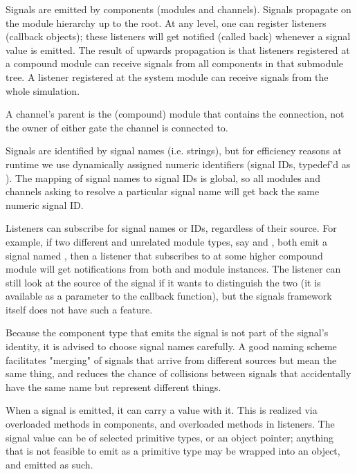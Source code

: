 Signals are emitted by components (modules and channels). Signals propagate
on the module hierarchy up to the root. At any level, one can register
listeners (callback objects); these listeners will get notified (called
back) whenever a signal value is emitted. The result of upwards propagation
is that listeners registered at a compound module can receive signals from
all components in that submodule tree. A listener registered at the system
module can receive signals from the whole simulation.

\begin{note}
    A channel's parent is the (compound) module that contains the connection,
    not the owner of either gate the channel is connected to.
\end{note}

Signals are identified by signal names (i.e. strings), but for efficiency reasons
at runtime we use dynamically assigned numeric identifiers (signal IDs,
typedef'd as ). The mapping of signal names to signal IDs is
global, so all modules and channels asking to resolve a particular signal name
will get back the same numeric signal ID.

Listeners can subscribe for signal names or IDs, regardless of their
source. For example, if two different and unrelated module types, say
 and , both emit a signal named , then
a listener that subscribes to  at some higher compound module
will get notifications from both  and  module
instances. The listener can still look at the source of the signal if it
wants to distinguish the two (it is available as a parameter to the
callback function), but the signals framework itself does not have such a
feature.

\begin{note}
  Because the component type that emits the signal is not part of the signal's
  identity, it is advised to choose signal names carefully. A good naming scheme
  facilitates "merging" of signals that arrive from different sources but
  mean the same thing, and reduces the chance of collisions between signals that
  accidentally have the same name but represent different things.
\end{note}

When a signal is emitted, it can carry a value with it. This is realized via
overloaded  methods in components, and overloaded 
methods in listeners. The signal value can be of selected primitive types, or an
object pointer; anything that is not feasible to emit as a primitive type may be
wrapped into an object, and emitted as such.

